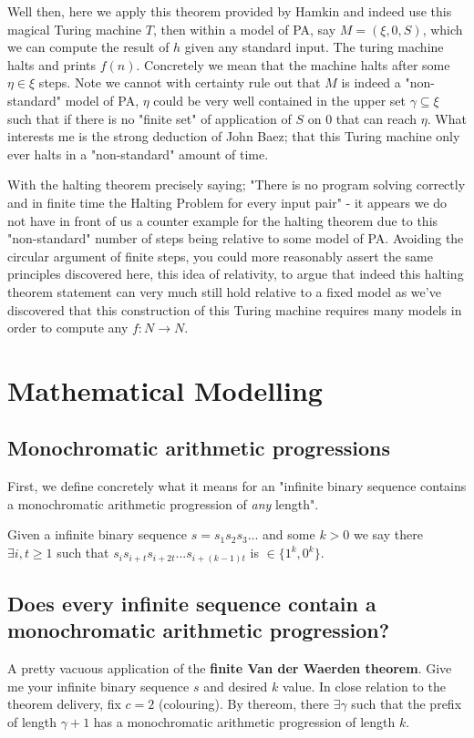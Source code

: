 \documentclass{article}
\begin{document}
Well then, here we apply this theorem provided by Hamkin and indeed use this magical Turing machine $T$, then within a model of PA, say $M = (\xi,0,S)$, which we can compute the result of $h$ given any standard input. The turing machine halts and prints $f(n)$. Concretely we mean that the machine halts after some $\eta \in \xi$ steps. Note we cannot with certainty rule out that $M$ is indeed a "non-standard" model of PA, $\eta$ could be very well contained in the upper set $\gamma \subseteq \xi$ such that if there is no "finite set" of application of $S$ on $0$ that can reach $\eta$. What interests me is the strong deduction of John Baez; that this Turing machine only ever halts in a "non-standard" amount of time.

With the halting theorem precisely saying; "There is no program solving correctly and in finite time the Halting Problem for every input pair" - it appears we do not have in front of us a counter example for the halting theorem due to this "non-standard" number of steps being relative to some model of PA. Avoiding the circular argument of finite steps, you could more reasonably assert the same principles discovered here, this idea of relativity, to argue that indeed this halting theorem statement can very much still hold relative to a fixed model as we've discovered that this construction of this Turing machine requires many models in order to compute any $f: N \rightarrow N$.

\pagebreak

\section{Mathematical Modelling}
\subsection{Monochromatic arithmetic progressions}
First, we define concretely what it means for an "infinite binary sequence contains a monochromatic arithmetic progression of \emph{any} length". 

Given a infinite binary sequence $s = s_{1}s_{2}s_{3}...$ and some $k>0$ we say there $\exists i,t \geq 1$ such that $s_{i}s_{i+t}s_{i+2t}...s_{i+(k-1)t}$ is $\in \{1^k,0^k\}$.

\subsection{Does every infinite sequence contain a monochromatic arithmetic progression?}
A pretty vacuous application of the \textbf{finite Van der Waerden theorem}. Give me your infinite binary sequence $s$ and desired $k$ value. In close relation to the theorem delivery, fix $c = 2$ (colouring). By thereom, there $\exists \gamma$ such that the prefix of length $\gamma + 1$ has a monochromatic arithmetic progression of length $k$.
\end{document}
